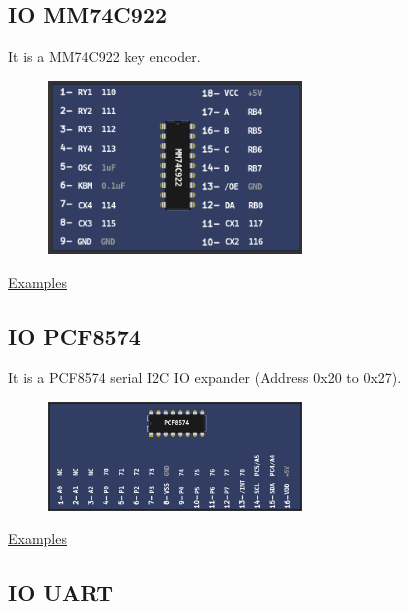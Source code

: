 \subsection{IO MM74C922}

It is a MM74C922 key encoder.

\begin{figure}[H]
\center
\includegraphics[width=0.6\textwidth]{img/part_MM74C922.png} 
\end{figure} 

\href{https://lcgamboa.github.io/picsimlab_examples/parts_IO_MM74C922.html}{Examples}

\vspace{0.5cm}

\subsection{IO PCF8574}

It is a PCF8574 serial I2C IO expander (Address 0x20 to 0x27).

\begin{figure}[H]
\center
\includegraphics[width=0.6\textwidth]{img/part_pcf8574.png} 
\end{figure} 

\href{https://lcgamboa.github.io/picsimlab_examples/parts_IO_PCF8574.html}{Examples}

\vspace{0.5cm}

\subsection{IO UART}

